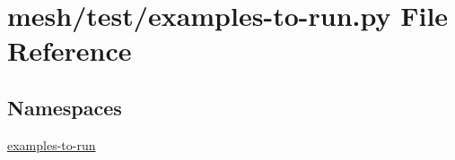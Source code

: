 \hypertarget{mesh_2test_2examples-to-run_8py}{}\section{mesh/test/examples-\/to-\/run.py File Reference}
\label{mesh_2test_2examples-to-run_8py}
\subsection*{Namespaces}
\begin{DoxyCompactItemize}
\item 
 \hyperlink{namespaceexamples-to-run}{examples-\/to-\/run}
\end{DoxyCompactItemize}
